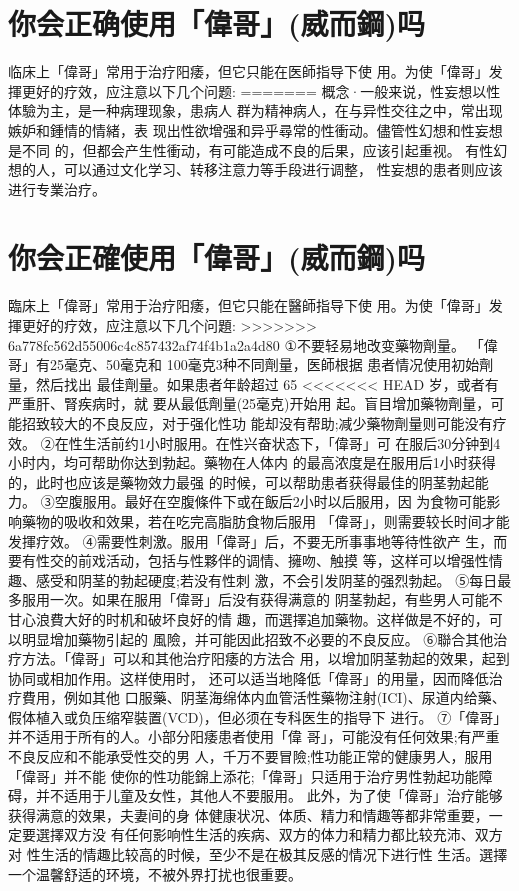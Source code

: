 \documentclass[12pt,UTF8]{ctexbook}
\begin{document}
\section{你会正确使用「偉哥」(威而鋼)吗}

临床上「偉哥」常用于治疗阳痿，但它只能在医師指导下使
用。为使「偉哥」发揮更好的疗效，应注意以下几个问题:
=======
概念·一般来说，性妄想以性体驗为主，是一种病理现象，患病人
群为精神病人，在与异性交往之中，常出现嫉妒和鍾情的情緒，表
现出性欲增强和异乎尋常的性衝动。儘管性幻想和性妄想是不同
的，但都会产生性衝动，有可能造成不良的后果，应该引起重视。
有性幻想的人，可以通过文化学习、转移注意力等手段进行调整，
性妄想的患者则应该进行专業治疗。

\section{你会正確使用「偉哥」(威而鋼)吗}

臨床上「偉哥」常用于治疗阳痿，但它只能在醫師指导下使
用。为使「偉哥」发揮更好的疗效，应注意以下几个问題:
>>>>>>> 6a778fc562d55006c4c857432af74f4b1a2a4d80
①不要轻易地改变藥物劑量。
「偉哥」有25毫克、50毫克和
100毫克3种不同劑量，医師根据
患者情况使用初始劑量，然后找出
最佳劑量。如果患者年龄超过 65
<<<<<<< HEAD
岁，或者有严重肝、腎疾病时，就
要从最低劑量(25毫克)开始用
起。盲目增加藥物劑量，可能招致较大的不良反应，对于强化性功
能却没有帮助;减少藥物劑量则可能没有疗效。
②在性生活前约1小时服用。在性兴奋状态下，「偉哥」可
在服后30分钟到4小时内，均可帮助你达到勃起。藥物在人体内
的最高浓度是在服用后1小时获得的，此时也应该是藥物效力最强
的时候，可以帮助患者获得最佳的阴茎勃起能力。
③空腹服用。最好在空腹條件下或在飯后2小时以后服用，因
为食物可能影响藥物的吸收和效果，若在吃完高脂肪食物后服用
「偉哥」，则需要较长时间才能发揮疗效。
④需要性刺激。服用「偉哥」后，不要无所事事地等待性欲产
生，而要有性交的前戏活动，包括与性夥伴的调情、擁吻、触摸
等，这样可以增强性情趣、感受和阴茎的勃起硬度;若没有性刺
激，不会引发阴茎的强烈勃起。
⑤每日最多服用一次。如果在服用「偉哥」后没有获得满意的
阴茎勃起，有些男人可能不甘心浪費大好的时机和破坏良好的情
趣，而選擇追加藥物。这样做是不好的，可以明显增加藥物引起的
風險，并可能因此招致不必要的不良反应。
⑥聯合其他治疗方法。「偉哥」可以和其他治疗阳痿的方法合
用，以增加阴茎勃起的效果，起到协同或相加作用。这样使用时，
还可以适当地降低「偉哥」的用量，因而降低治疗費用，例如其他
口服藥、阴茎海绵体内血管活性藥物注射(ICI)、尿道内给藥、
假体植入或负压缩窄裝置(VCD)，但必须在专科医生的指导下
进行。
⑦「偉哥」并不适用于所有的人。小部分阳痿患者使用「偉
哥」，可能没有任何效果;有严重不良反应和不能承受性交的男
人，千万不要冒險;性功能正常的健康男人，服用「偉哥」并不能
使你的性功能錦上添花;「偉哥」只适用于治疗男性勃起功能障
碍，并不适用于儿童及女性，其他人不要服用。
此外，为了使「偉哥」治疗能够获得满意的效果，夫妻间的身
体健康状况、体质、精力和情趣等都非常重要，一定要選擇双方没
有任何影响性生活的疾病、双方的体力和精力都比较充沛、双方对
性生活的情趣比较高的时候，至少不是在极其反感的情况下进行性
生活。選擇一个温馨舒适的环境，不被外界打扰也很重要。
\end{document}

